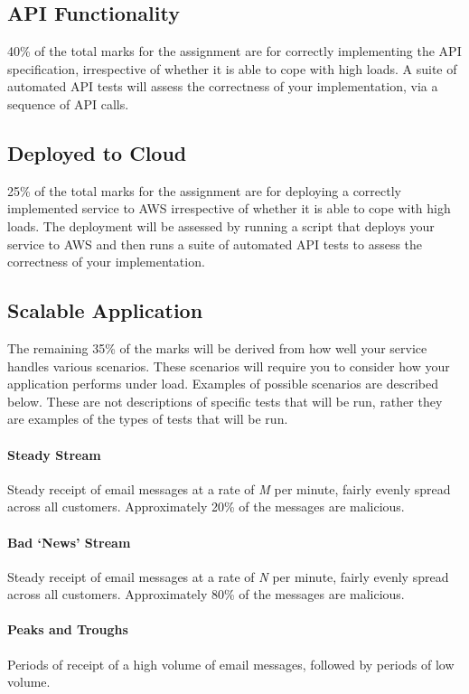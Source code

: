 \documentclass{csse4400}
\begin{document}
\subsection{API Functionality} %
40\% of the total marks for the assignment are for correctly implementing the API specification, irrespective of whether it is able to cope with high loads. A suite of automated API tests will assess the correctness of your implementation, via a sequence of API calls.

\subsection{Deployed to Cloud} %
25\% of the total marks for the assignment are for deploying a correctly implemented service to AWS irrespective of whether it is able to cope with high loads.
The deployment will be assessed by running a script that deploys your service to AWS and then runs a suite of automated API tests to assess the correctness of your implementation.

\subsection{Scalable Application}\label{sec:scenarios} %
The remaining 35\% of the marks will be derived from how well your service handles various scenarios.
These scenarios will require you to consider how your application performs under load.
Examples of possible scenarios are described below.
These are not descriptions of specific tests that will be run, rather they are examples of the types of tests that will be run.

\paragraph{Steady Stream}
Steady receipt of email messages at a rate of \emph{M} per minute, fairly evenly spread across all customers.
Approximately 20\% of the messages are malicious.

\paragraph{Bad `News' Stream}
Steady receipt of email messages at a rate of \emph{N} per minute, fairly evenly spread across all customers.
Approximately 80\% of the messages are malicious.

\paragraph{Peaks and Troughs}
Periods of receipt of a high volume of email messages, followed by periods of low volume.
\end{document}
